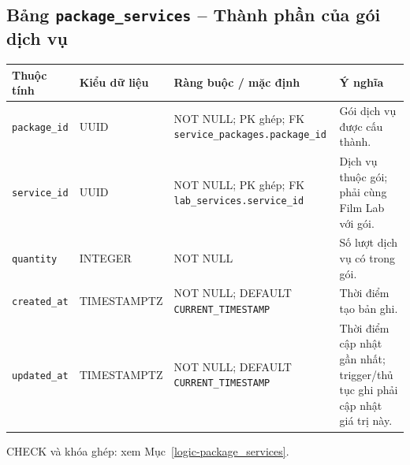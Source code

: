 \subsection{Bảng \texttt{package\_\allowbreak{}services} -- Thành phần của gói dịch vụ}
\label{dictionary-package_services}
\begingroup
\footnotesize
\setlength{\tabcolsep}{3pt}
\begin{longtable}{>{\raggedright\arraybackslash}p{3.1cm}>{\raggedright\arraybackslash}p{2.5cm}>{\raggedright\arraybackslash}p{3.7cm}>{\raggedright\arraybackslash}p{4.3cm}}
\toprule
Thuộc tính & Kiểu dữ liệu & Ràng buộc / mặc định & Ý nghĩa \\
\midrule
\endhead
\texttt{package\_\allowbreak{}id} & UUID & NOT NULL; PK ghép; FK \texttt{service\_\allowbreak{}packages.package\_\allowbreak{}id} & Gói dịch vụ được cấu thành. \\
\texttt{service\_\allowbreak{}id} & UUID & NOT NULL; PK ghép; FK \texttt{lab\_\allowbreak{}services.service\_\allowbreak{}id} & Dịch vụ thuộc gói; phải cùng Film Lab với gói. \\
\texttt{quantity} & INTEGER & NOT NULL & Số lượt dịch vụ có trong gói. \\
\texttt{created\_\allowbreak{}at} & TIMESTAMPTZ & NOT NULL; DEFAULT \texttt{CURRENT\_\allowbreak{}TIMESTAMP} & Thời điểm tạo bản ghi. \\
\texttt{updated\_\allowbreak{}at} & TIMESTAMPTZ & NOT NULL; DEFAULT \texttt{CURRENT\_\allowbreak{}TIMESTAMP} & Thời điểm cập nhật gần nhất; trigger/thủ tục ghi phải cập nhật giá trị này. \\
\bottomrule
\end{longtable}
\endgroup
CHECK và khóa ghép: xem Mục~\ref{logic-package_services}.
